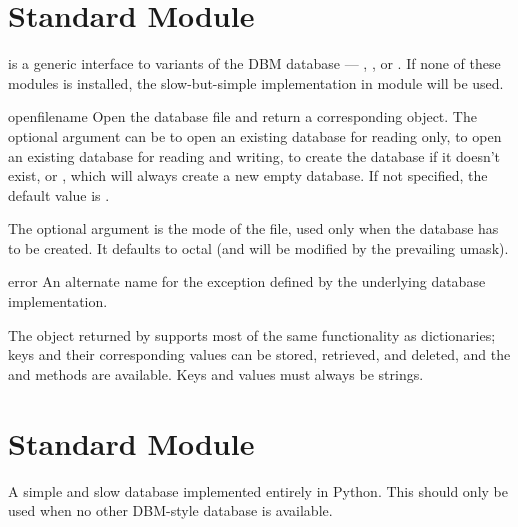\section{Standard Module }
\label{module-anydbm}

 is a generic interface to variants of the DBM
database --- ,
, or .
If none of these modules is installed, the slow-but-simple
implementation in module  will
be used.

\begin{funcdesc}{open}{filename}
Open the database file  and return a corresponding object.
The optional  argument can be
 to open an existing database for reading only,
 to open an existing database for reading and writing,
 to create the database if it doesn't exist, or
, which will always create a new empty database.  If not
specified, the default value is .

The optional  argument is the \UNIX{} mode of the file, used
only when the database has to be created.  It defaults to octal
 (and will be modified by the prevailing umask).
\end{funcdesc}

\begin{excdesc}{error}
An alternate name for the  exception defined by the
underlying database implementation.
\end{excdesc}

The object returned by  supports most of the same
functionality as dictionaries; keys and their corresponding values can
be stored, retrieved, and deleted, and the  and
 methods are available.  Keys and values must always be
strings.



\section{Standard Module }
\label{module-dumbdbm}

A simple and slow database implemented entirely in Python.  This
should only be used when no other DBM-style database is available.


